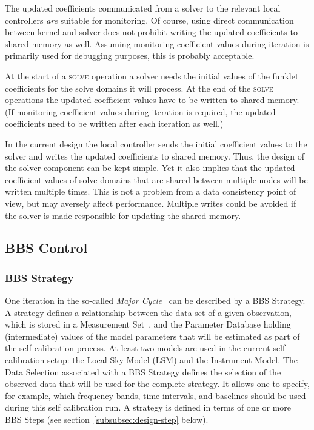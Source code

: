 \documentclass[10pt]{lofar}
\newcommand{\solve}{\textsc{solve}\xspace}
\begin{document}
The updated coefficients communicated from a solver to the relevant local
controllers \emph{are} suitable for monitoring. Of course, using direct
communication between kernel and solver does not prohibit writing the updated
coefficients to shared memory as well. Assuming monitoring coefficient values
during iteration is primarily used for debugging purposes, this is probably
acceptable.

At the start of a \solve operation a solver needs the initial values of the
funklet coefficients for the solve domains it will process. At the end of the
\solve operations the updated coefficient values have to be written to shared
memory. (If monitoring coefficient values during iteration is required, the
updated coefficients need to be written after each iteration as well.)

In the current design the local controller sends the initial coefficient values
to the solver and writes the updated coefficients to shared memory. Thus, the
design of the solver component can be kept simple. Yet it also implies that the
updated coefficient values of solve domains that are shared between multiple
nodes will be written multiple times. This is not a problem from a data
consistency point of view, but may aversely affect performance. Multiple writes
could be avoided if the solver is made responsible for updating the shared
memory.

\subsection{BBS Control}
\label{subsec:design-control}

\subsubsection{BBS Strategy}
\label{subsubsec:design-strategy}
One iteration in the so-called \emph{Major
Cycle}~\cite[sec.~4.1]{LOFAR-ASTRON-SDD-050} can be described by a BBS
Strategy. A strategy defines a relationship between the data set of a given
observation, which is stored in a Measurement Set~\cite{aips++note229}, and
the Parameter Database holding (intermediate) values of the model parameters
that will be estimated as part of the self calibration process. At least two
models are used in the current self calibration setup: the Local Sky Model
(LSM) and the Instrument Model. The Data Selection associated with a BBS
Strategy defines the selection of the observed data that will be used for the
complete strategy. It allows one to specify, for example, which frequency bands,
time intervals, and baselines should be used during this self calibration run. A
strategy is defined in terms of one or more BBS Steps (see
section~\ref{subsubsec:design-step} below).
\end{document}
